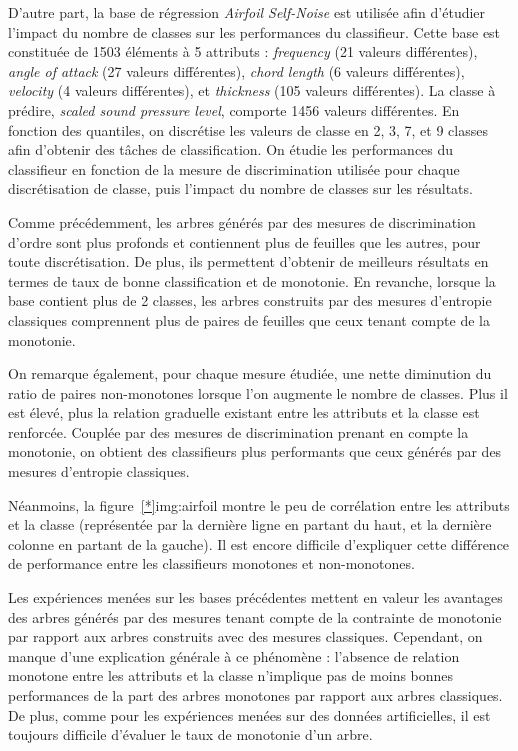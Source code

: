 \documentclass[a4paper]{article}
\newcommand{\figref}[1]{figure~\ref{#1}}
\begin{document}
D'autre part, la base de régression \emph{Airfoil Self-Noise} est utilisée afin
d'étudier l'impact du nombre de classes sur les performances du classifieur.
Cette base est constituée de 1503 éléments à 5 attributs : \emph{frequency} (21
valeurs différentes), \emph{angle of attack} (27 valeurs différentes),
\emph{chord length} (6 valeurs différentes), \emph{velocity} (4 valeurs
différentes), et \emph{thickness} (105 valeurs différentes). La classe à
prédire, \emph{scaled sound pressure level}, comporte 1456 valeurs différentes.
En fonction des quantiles, on discrétise les valeurs de classe en 2, 3, 7, et 9
classes afin d'obtenir des tâches de classification. On
étudie les performances du classifieur en fonction de la mesure de
discrimination utilisée pour chaque discrétisation de classe, puis l'impact du
nombre de classes sur les résultats.

Comme précédemment, les arbres générés par des mesures de discrimination d'ordre
sont plus profonds et contiennent plus de feuilles que les autres, pour toute
discrétisation. De plus, ils permettent d'obtenir de meilleurs résultats en
termes de taux de bonne classification et de monotonie. En revanche, lorsque la
base contient plus de 2 classes, les arbres construits par des mesures
d'entropie classiques comprennent plus de paires de feuilles que ceux tenant
compte de la monotonie. 

On remarque également, pour chaque mesure étudiée, une nette diminution du ratio
de paires non-monotones lorsque l'on augmente le nombre de classes. Plus il est
élevé, plus la relation graduelle existant entre les attributs et la classe est
renforcée. Couplée par des mesures de discrimination prenant en compte la
monotonie, on obtient des classifieurs plus performants que ceux générés par des
mesures d'entropie classiques.

Néanmoins, la \figref*{img:airfoil} montre le peu de corrélation entre les
attributs et la classe (représentée par la dernière ligne en partant du haut, et
la dernière colonne en partant de la gauche). Il est encore difficile
d'expliquer cette différence de performance entre les classifieurs monotones et
non-monotones.

Les expériences menées sur les bases précédentes mettent en valeur les avantages
des arbres générés par des mesures tenant compte de la contrainte de monotonie
par rapport aux arbres construits avec des mesures classiques. Cependant, on
manque d'une explication générale à ce phénomène : l'absence de relation
monotone entre les attributs et la classe n'implique pas de moins bonnes
performances de la part des arbres monotones par rapport aux arbres classiques.
De plus, comme pour les expériences menées sur des données artificielles, il est
toujours difficile d'évaluer le taux de monotonie d'un arbre.
\end{document}
